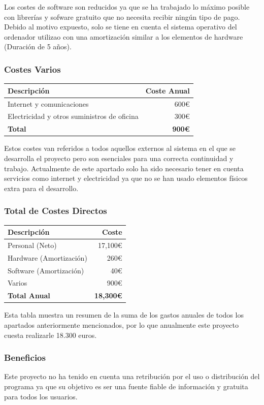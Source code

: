Los costes de software son reducidos ya que se ha trabajado lo máximo posible con librerías y sofware gratuito que no necesita recibir ningún tipo de pago. 
Debido al motivo expuesto, solo se tiene en cuenta el sistema operativo del ordenador utilizao con una amortización similar a los elementos de hardware (Duración de 5 años).

\subsubsection*{Costes Varios}

\begin{tabular}{lr}
\toprule
Descripción & Coste Anual \\
\midrule
Internet y comunicaciones & 600€ \\
Electricidad y otros suministros de oficina & 300€ \\
\textbf{Total} & \textbf{900€} \\
\bottomrule
\end{tabular}

Estos costes van referidos a todos aquellos externos al sistema en el que se desarrolla el proyecto pero son esenciales para una correcta continuidad y trabajo. 
Actualmente de este apartado solo ha sido necesario tener en cuenta servicios como internet y electricidad ya que no se han usado elementos físicos extra para el desarrollo.
\subsubsection*{Total de Costes Directos}

\begin{tabular}{lr}
\toprule
Descripción & Coste \\
\midrule
Personal (Neto) & 17,100€ \\
Hardware (Amortización) & 260€ \\
Software (Amortización) & 40€ \\
Varios & 900€ \\
\textbf{Total Anual} & \textbf{18,300€} \\
\bottomrule
\end{tabular}

Esta tabla muestra un resumen de la suma de los gastos anuales de todos los apartados anteriormente mencionados, por lo que anualmente este proyecto cuesta realizarle 18.300 euros.

\subsubsection{Beneficios}
Este proyecto no ha tenido en cuenta una retribución por el uso o distribución del programa ya que su objetivo es ser una fuente fiable de información y gratuita para todos los usuarios.
